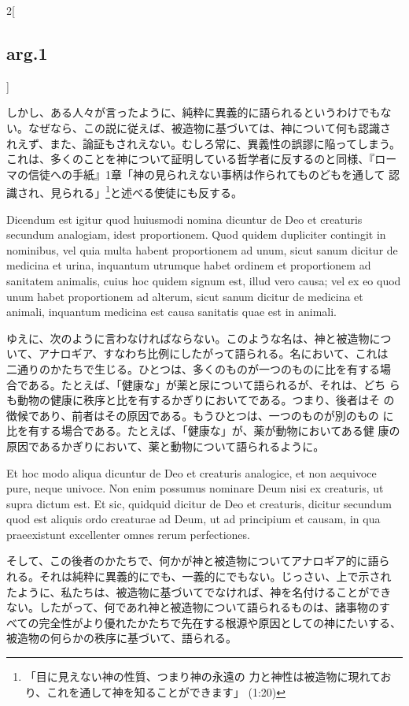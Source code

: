 \documentclass[paper=a4paper,fontsize=10pt,jafontsize=9pt,titlepage]{jlreq}
\begin{document}
\begin{paracol}{2}[\subsection{arg.1}]
\switchcolumn

しかし、ある人々が言ったように、純粋に異義的に語られるというわけでもな
い。なぜなら、この説に従えば、被造物に基づいては、神について何も認識さ
れえず、また、論証もされえない。むしろ常に、異義性の誤謬に陥ってしまう。
これは、多くのことを神について証明している哲学者に反するのと同様、『ロー
マの信徒への手紙』1章「神の見られえない事柄は作られてものどもを通して
認識され、見られる」\footnote{「目に見えない神の性質、つまり神の永遠の
力と神性は被造物に現れており、これを通して神を知ることができます」
(1:20) }と述べる使徒にも反する。

\switchcolumn*

Dicendum est igitur quod huiusmodi nomina dicuntur de Deo et creaturis
secundum analogiam, idest proportionem. Quod quidem dupliciter
contingit in nominibus, vel quia multa habent proportionem ad unum,
sicut sanum dicitur de medicina et urina, inquantum utrumque habet
ordinem et proportionem ad sanitatem animalis, cuius hoc quidem signum
est, illud vero causa; vel ex eo quod unum habet proportionem ad
alterum, sicut sanum dicitur de medicina et animali, inquantum
medicina est causa sanitatis quae est in animali.

\switchcolumn

ゆえに、次のように言わなければならない。このような名は、神と被造物につ
いて、アナロギア、すなわち比例にしたがって語られる。名において、これは
二通りのかたちで生じる。ひとつは、多くのものが一つのものに比を有する場
合である。たとえば、「健康な」が薬と尿について語られるが、それは、どち
らも動物の健康に秩序と比を有するかぎりにおいてである。つまり、後者はそ
の徴候であり、前者はその原因である。もうひとつは、一つのものが別のもの
に比を有する場合である。たとえば、「健康な」が、薬が動物においてある健
康の原因であるかぎりにおいて、薬と動物について語られるように。

\switchcolumn*

Et hoc modo aliqua dicuntur de Deo et creaturis analogice, et non
aequivoce pure, neque univoce. Non enim possumus nominare Deum nisi ex
creaturis, ut supra dictum est. Et sic, quidquid dicitur de Deo et
creaturis, dicitur secundum quod est aliquis ordo creaturae ad Deum,
ut ad principium et causam, in qua praeexistunt excellenter omnes
rerum perfectiones.

\switchcolumn

そして、この後者のかたちで、何かが神と被造物についてアナロギア的に語ら
れる。それは純粋に異義的にでも、一義的にでもない。じっさい、上で示され
たように、私たちは、被造物に基づいてでなければ、神を名付けることができ
ない。したがって、何であれ神と被造物について語られるものは、諸事物のす
べての完全性がより優れたかたちで先在する根源や原因としての神にたいする、
被造物の何らかの秩序に基づいて、語られる。


\end{paracol}
\end{document}

